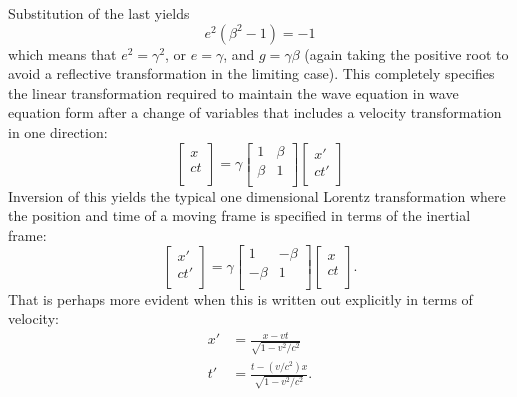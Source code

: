 %
Substitution of the last yields
%
\begin{equation}\label{eqn:lorentz:140}
e^2 (\beta^2 - 1) = -1
\end{equation}
%
which means that \(e^2 = \gamma^2\), or \(e = \gamma\), and \(g = \gamma \beta\) (again taking the positive root to avoid a reflective transformation in the limiting case).  This completely specifies the linear
transformation required to maintain the wave equation in wave equation form after a change of variables that includes
a velocity transformation in one direction:
%
\begin{equation}
\begin{bmatrix}
x \\
ct \\
\end{bmatrix}
=
\gamma
\begin{bmatrix}
1 & \beta \\
\beta & 1 \\
\end{bmatrix}
\begin{bmatrix}
x' \\
c t' \\
\end{bmatrix}
\end{equation}
%
Inversion of this yields the typical one dimensional Lorentz transformation where the position and time of a moving
frame is specified in terms of the inertial frame:
%
\begin{equation}
\begin{bmatrix}
x' \\
ct' \\
\end{bmatrix}
=
\gamma
\begin{bmatrix}
1 & -\beta \\
-\beta & 1 \\
\end{bmatrix}
\begin{bmatrix}
x \\
c t \\
\end{bmatrix}.
\end{equation}
%
That is perhaps more evident when this is written out explicitly in terms of velocity:
%
\begin{equation}\label{eqn:lorentz:380}
\begin{aligned}
x' &= \frac{x - v t}{\sqrt{1 - v^2/c^2}} \\
t' &= \frac{t - (v/c^2) x}{\sqrt{1 - v^2/c^2}}.
\end{aligned}
\end{equation}
%
